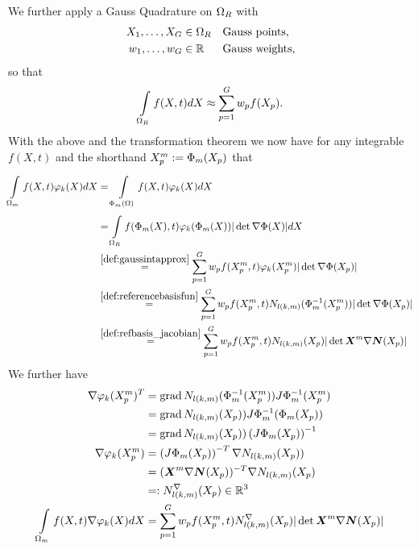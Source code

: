 We further apply a Gauss Quadrature on $\Omega_R$ with
\begin{align}
	X_1,\ldots,X_G  &\in \Omega_R &&\text{Gauss points},\\
	w_1,\ldots,w_G  &\in \mathbb{R} &&\text{Gauss weights},
\end{align}
so that
\begin{align}
	\int\limits_{\Omega_R}^{} f(X,t)dX \approx \sum\limits_{p=1}^{G} w_pf(X_p).\label{def:gaussintapprox}
\end{align}
With the above and the transformation theorem we now have for any integrable $f(X,t)$ and the shorthand $X^m_p := \Phi_m(X_p)$ that
\begin{align}
	\intl{\Omega_m}{}f(X,t)\varphi_k(X)dX &= \intl{\Phi_m(\Omega)}{}f(X,t)\varphi_k(X)dX\label{eq:fphidx}\\
	& = \intl{\Om}{}f(\Phi_m(X),t)\varphi_k(\Phi_m(X))|\det \nabla\Phi(X)|dX\nonumber\\
	& \re{def:gaussintapprox} \sumgp w_pf(\pmp,t)\varphi_k(\pmp)|\det \nabla\Phi(X_p)|\nonumber\\
	& \re{def:referencebasisfun} \sumgp w_pf(\pmp,t)N_{l(k,m)}(\Phi_m^{-1}(\pmp))|\det \nabla\Phi(X_p)|\nonumber\\
	& \re{def:refbasis_jacobian} \sumgp w_pf(\pmp,t)N_{l(k,m)}(X_p)|\det \vX^m\nabla\vN(X_p)|\nonumber
\end{align}
We further have
\begin{align}
	\nabla\varphi_k(X^m_p)^T &= \operatorname{grad} N_{l(k,m)}(\Phi^{-1}_m(X^m_p))J\Phi^{-1}_m(X^m_p)\nonumber\\
		&= \operatorname{grad} N_{l(k,m)}(X_p))J\Phi^{-1}_m(\Phi_m(X_p))\nonumber\\
		&= \operatorname{grad} N_{l(k,m)}(X_p))\left(J\Phi_m(X_p)\right)^{-1}\nonumber\\
	\nabla\varphi_k(X^m_p) &= \left(J\Phi_m(X_p)\right)^{-T}\nabla N_{l(k,m)}(X_p))\nonumber\\
		&= (\boldsymbol{X}^m\nabla\boldsymbol{N}(X_p))^{-T}\nabla N_{l(k,m)}(X_p)\\
		&=: N^\nabla_{l(k,m)}(X_p) \in\mathbb{R}^3\\
	\int\limits_{\Omega_m}^{}f(X,t)\nabla\varphi_k(X)dX &= \sum\limits_{p=1}^{G} w_pf(X^m_p,t)N^\nabla_{l(k,m)}(X_p)|\det \boldsymbol{X}^m\nabla\boldsymbol{N}(X_p)|\label{eq:fgradphidx}
\end{align}

